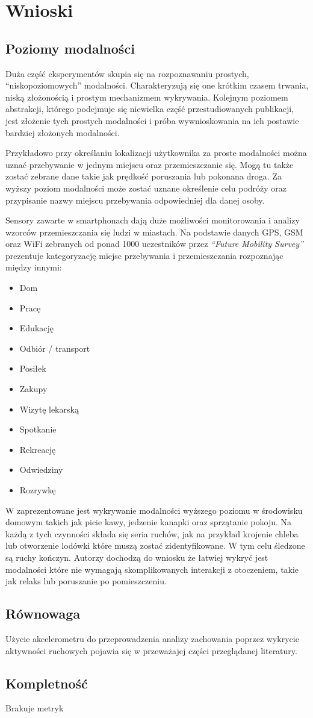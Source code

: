 \section{Wnioski}

\subsection{Poziomy modalności}
Duża część eksperymentów skupia się na rozpoznawaniu prostych, ``niskopoziomowych'' modalności. Charakteryzują się one krótkim czasem trwania, niską złożonością i prostym mechanizmem wykrywania. Kolejnym poziomem abstrakcji, którego podejmuje się niewielka część przestudiowanych publikacji, jest złożenie tych prostych modalności i próba wywnioskowania na ich postawie bardziej złożonych modalności.

Przykładowo przy określaniu lokalizacji użytkownika za proste modalności można uznać przebywanie w jednym miejscu oraz przemieszczanie się. Mogą tu także zostać zebrane dane takie jak prędkość poruszania lub pokonana droga. Za wyższy poziom modalności może zostać uznane określenie celu podróży oraz przypisanie  nazwy miejscu przebywania odpowiedniej dla danej osoby.

Sensory zawarte w smartphonach dają duże możliwości monitorowania i analizy wzorców przemieszczania się ludzi w miastach. Na podstawie danych GPS, GSM oraz WiFi zebranych od ponad 1000 uczestników przez \textit{``Future Mobility Survey''} \cite{26_Mobility_Sensing} prezentuje kategoryzację miejsc przebywania i przemieszczania rozpoznając między innymi:
\begin{itemize}
    \item Dom
    \item Pracę
    \item Edukację
    \item Odbiór / transport
    \item Posiłek
    \item Zakupy
    \item Wizytę lekarską
    \item Spotkanie
    \item Rekreację
    \item Odwiedziny
    \item Rozrywkę
\end{itemize}

W \cite{38_High_Lvl_HAR} zaprezentowane jest wykrywanie modalności wyższego poziomu w środowisku domowym takich jak picie kawy, jedzenie kanapki oraz sprzątanie pokoju. Na każdą z tych czynności składa się seria ruchów, jak na przykład krojenie chleba lub otworzenie lodówki które muszą zostać zidentyfikowane. W tym celu śledzone są ruchy kończyn. Autorzy dochodzą do wniosku że łatwiej wykryć jest modalności które nie wymagają skomplikowanych interakcji z otoczeniem, takie jak relaks lub poruszanie po pomieszczeniu.

\subsection{Równowaga}
Użycie akcelerometru do przeprowadzenia analizy zachowania poprzez wykrycie aktywności ruchowych pojawia się w przeważajej części przeglądanej literatury.

\subsection{Kompletność}
Brakuje metryk
